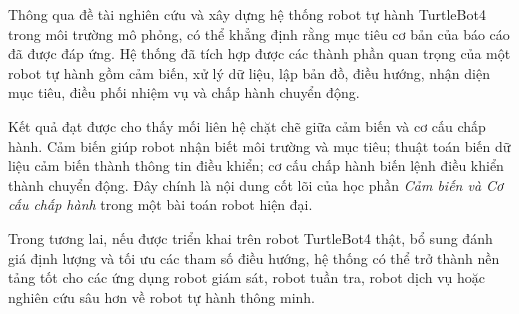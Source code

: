 Thông qua đề tài nghiên cứu và xây dựng hệ thống robot tự hành TurtleBot4 trong môi trường mô phỏng, có thể khẳng định rằng mục tiêu cơ bản của báo cáo đã được đáp ứng. Hệ thống đã tích hợp được các thành phần quan trọng của một robot tự hành gồm cảm biến, xử lý dữ liệu, lập bản đồ, điều hướng, nhận diện mục tiêu, điều phối nhiệm vụ và chấp hành chuyển động.

Kết quả đạt được cho thấy mối liên hệ chặt chẽ giữa cảm biến và cơ cấu chấp hành. Cảm biến giúp robot nhận biết môi trường và mục tiêu; thuật toán biến dữ liệu cảm biến thành thông tin điều khiển; cơ cấu chấp hành biến lệnh điều khiển thành chuyển động. Đây chính là nội dung cốt lõi của học phần \textit{Cảm biến và Cơ cấu chấp hành} trong một bài toán robot hiện đại.

Trong tương lai, nếu được triển khai trên robot TurtleBot4 thật, bổ sung đánh giá định lượng và tối ưu các tham số điều hướng, hệ thống có thể trở thành nền tảng tốt cho các ứng dụng robot giám sát, robot tuần tra, robot dịch vụ hoặc nghiên cứu sâu hơn về robot tự hành thông minh.